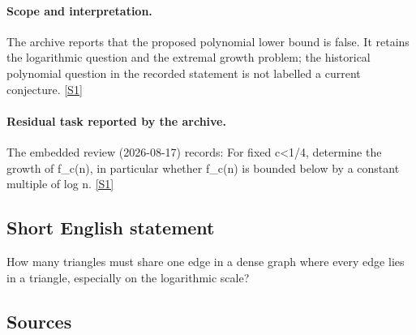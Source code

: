 \documentclass[11pt,a4paper]{article}
\newcommand{\sref}[2]{\hyperlink{source:#1:#2}{[S#2]}}
\begin{document}
\paragraph{Scope and interpretation.}

The archive reports that the proposed polynomial lower bound is false. It retains the logarithmic question and the extremal growth problem; the historical polynomial question in the recorded statement is not labelled a current conjecture. \sref{statement}{1}

\paragraph{Residual task reported by the archive.}

The embedded review (2026-08-17) records: For fixed c<1/4, determine the growth of f\_c(n), in particular whether f\_c(n) is bounded below by a constant multiple of log n. \sref{statement}{1}

\subsection{Short English statement}

How many triangles must share one edge in a dense graph where every edge lies in a triangle, especially on the logarithmic scale?

\subsection{Sources}
\end{document}
